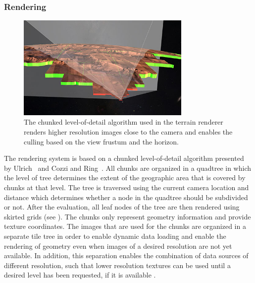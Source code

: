 \subsubsection{Rendering} \label{contributions:astro:gb:rendering}
\begin{figure}
\centering
\includegraphics[width=0.75\textwidth]{figures/contributions/gb/culling.png}
\caption{The chunked level-of-detail algorithm used in the terrain renderer renders higher resolution images close to the camera and enables the culling based on the view frustum and the horizon.}
\label{contributions:astro:gb:culling}
\end{figure}

The rendering system is based on a chunked level-of-detail algorithm presented by Ulrich~\cite{ulrich2002rendering} and Cozzi and Ring~\cite{cozzi20113d}.  All chunks are organized in a quadtree in which the level of tree determines the extent of the geographic area that is covered by chunks at that level.  The tree is traversed using the current camera location and distance which determines whether a node in the quadtree should be subdivided or not.  After the evaluation, all leaf nodes of the tree are then rendered using skirted grids (see ).  The chunks only represent geometry information and provide texture coordinates.  The images that are used for the chunks are organized in a separate tile tree in order to enable dynamic data loading and enable the rendering of geometry even when images of a desired resolution are not yet available.  In addition, this separation enables the combination of data sources of different resolution, such that lower resolution textures can be used until a desired level has been requested, if it is available .

